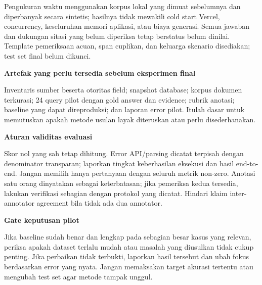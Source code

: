 \documentclass[11pt,a4paper]{article}
\newcommand{\subheading}[1]{\vspace{3pt}\textbf{#1}\par}
\begin{document}
Pengukuran waktu menggunakan korpus lokal yang dimuat sebelumnya dan diperbanyak secara sintetis; hasilnya tidak mewakili cold start Vercel, concurrency, keseluruhan memori aplikasi, atau biaya generasi. Semua jawaban dan dukungan sitasi yang belum diperiksa tetap berstatus belum dinilai. Template pemeriksaan acuan, span cuplikan, dan keluarga skenario disediakan; test set final belum dikunci.

\subheading{Artefak yang perlu tersedia sebelum eksperimen final}
Inventaris sumber beserta otoritas field; snapshot database; korpus dokumen terkurasi; 24 query pilot dengan gold answer dan evidence; rubrik anotasi; baseline yang dapat direproduksi; dan laporan error pilot. Itulah dasar untuk memutuskan apakah metode usulan layak diteruskan atau perlu disederhanakan.

\subheading{Aturan validitas evaluasi}
Skor nol yang sah tetap dihitung. Error API/parsing dicatat terpisah dengan denominator transparan; laporkan tingkat keberhasilan eksekusi dan hasil end-to-end. Jangan memilih hanya pertanyaan dengan seluruh metrik non-zero. Anotasi satu orang dinyatakan sebagai keterbatasan; jika pemeriksa kedua tersedia, lakukan verifikasi sebagian dengan protokol yang dicatat. Hindari klaim inter-annotator agreement bila tidak ada dua annotator.

\subheading{Gate keputusan pilot}
Jika baseline sudah benar dan lengkap pada sebagian besar kasus yang relevan, periksa apakah dataset terlalu mudah atau masalah yang diusulkan tidak cukup penting. Jika perbaikan tidak terbukti, laporkan hasil tersebut dan ubah fokus berdasarkan error yang nyata. Jangan memaksakan target akurasi tertentu atau mengubah test set agar metode tampak unggul.
\end{document}
